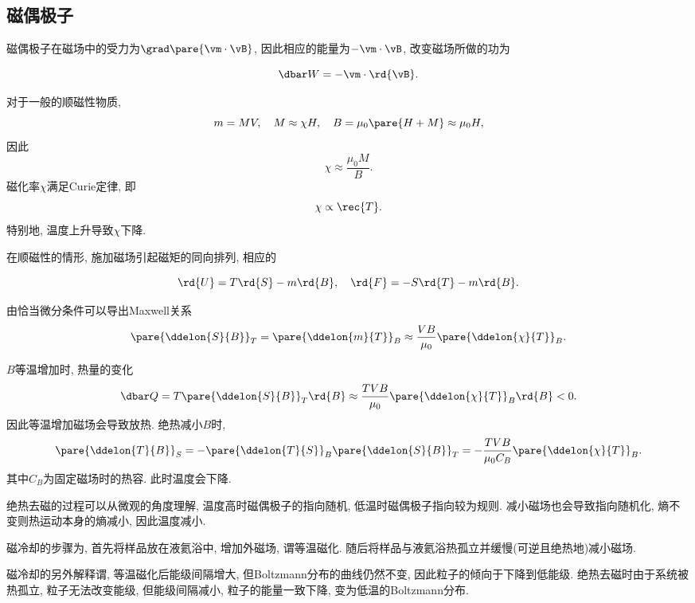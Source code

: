 \documentclass[../Thermal.tex]{subfiles}
\begin{document}
\subsection{磁偶极子}
磁偶极子在磁场中的受力为$\grad \pare{\vm \cdot \vB}$, 因此相应的能量为$-\vm\cdot\vB$, 改变磁场所做的功为
\begin{finale}
\[ \dbar W = - \vm\cdot \rd{\vB}. \]
\end{finale}
对于一般的顺磁性物质,
\[ m = MV,\quad M \approx \chi H,\quad B = \mu_0\pare{H+M}\approx \mu_0 H, \]
因此
\[ \chi \approx \frac{\mu_0 M}{B}. \]
磁化率$\chi$满足Curie定律, 即
\[ \chi \propto \rec{T}. \]
特别地, 温度上升导致$\chi$下降.
\par
在顺磁性的情形, 施加磁场引起磁矩的同向排列, 相应的
\begin{finale}
\[ \rd{U} = T\rd{S} - m\rd{B},\quad \rd{F} = -S\rd{T} - m\rd{B}. \]
\end{finale}
由恰当微分条件可以导出Maxwell关系
\begin{equation}
\label{eq:dsdb=dchidt}
\pare{\ddelon{S}{B}}_T = \pare{\ddelon{m}{T}}_B \approx \frac{VB}{\mu_0}\pare{\ddelon{\chi}{T}}_B.
\end{equation}
\begin{ex}
$B$等温增加时, 热量的变化
\[ \dbar Q = T\pare{\ddelon{S}{B}}_T\rd{B} \approx \frac{TVB}{\mu_0}\pare{\ddelon{\chi}{T}}_B\rd{B} < 0. \]
因此等温增加磁场会导致放热. 绝热减小$B$时,
\[ \pare{\ddelon{T}{B}}_S = -\pare{\ddelon{T}{S}}_B \pare{\ddelon{S}{B}}_T = -\frac{TVB}{\mu_0 C_B}\pare{\ddelon{\chi}{T}}_B. \]
其中$C_B$为固定磁场时的热容. 此时温度会下降.
\end{ex}
绝热去磁的过程可以从微观的角度理解, 温度高时磁偶极子的指向随机, 低温时磁偶极子指向较为规则. 减小磁场也会导致指向随机化, 熵不变则热运动本身的熵减小, 因此温度减小.
\par
磁冷却的步骤为, 首先将样品放在液氦浴中, 增加外磁场, 谓等温磁化. 随后将样品与液氦浴热孤立并缓慢(可逆且绝热地)减小磁场.
\par
磁冷却的另外解释谓, 等温磁化后能级间隔增大, 但Boltzmann分布的曲线仍然不变, 因此粒子的倾向于下降到低能级. 绝热去磁时由于系统被热孤立, 粒子无法改变能级, 但能级间隔减小, 粒子的能量一致下降, 变为低温的Boltzmann分布.
\end{document}
